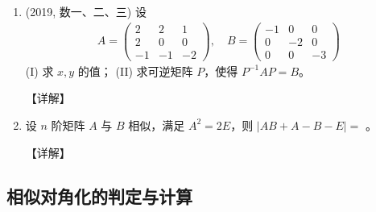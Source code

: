 \documentclass[12pt, a4paper, oneside, UTF8]{ctexbook}
\begin{document}
\begin{enumerate}[label=\arabic*.,start=6]
    \item (2019, 数一、二、三) 设
    \begin{align*}
    A = \begin{pmatrix}
    2 & 2 & 1 \\
    2 & 0 & 0 \\
    -1 & -1 & -2
    \end{pmatrix}, \quad
    B = \begin{pmatrix}
    -1 & 0 & 0 \\
    0 & -2 & 0 \\
    0 & 0 & -3
    \end{pmatrix}
    \end{align*}
    (I) 求 $x, y$ 的值；
    (II) 求可逆矩阵 $P$，使得 $P^{-1}AP = B$。
    
    \begin{solution}
    【详解】
    \end{solution}
    
    \item 设 $n$ 阶矩阵 $A$ 与 $B$ 相似，满足 $A^2 = 2E$，则 $|AB + A - B - E| = $ \underline{\hspace{3cm}}。
    
    \begin{solution}
    【详解】
    \end{solution}
\end{enumerate}

\subsection{相似对角化的判定与计算}
\end{document}
